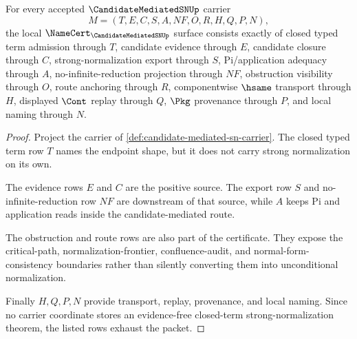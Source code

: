 \begin{theorem}
\label{thm:candidate-mediated-sn-namecert-obligations}
For every accepted $\CandidateMediatedSNUp$ carrier
$$
M=(T,E,C,S,A,NF,O,R,H,Q,P,N),
$$
the local $\NameCert_{\CandidateMediatedSNUp}$ surface consists exactly of closed typed term admission through $T$, candidate evidence through $E$, candidate closure through $C$, strong-normalization export through $S$, Pi/application adequacy through $A$, no-infinite-reduction projection through $NF$, obstruction visibility through $O$, route anchoring through $R$, componentwise $\hsame$ transport through $H$, displayed $\Cont$ replay through $Q$, $\Pkg$ provenance through $P$, and local naming through $N$.
\end{theorem}
\begin{proof}
Project the carrier of \autoref{def:candidate-mediated-sn-carrier}. The closed typed term row $T$ names the endpoint shape, but it does not carry strong normalization on its own.

The evidence rows $E$ and $C$ are the positive source. The export row $S$ and no-infinite-reduction row $NF$ are downstream of that source, while $A$ keeps Pi and application reads inside the candidate-mediated route.

The obstruction and route rows are also part of the certificate. They expose the critical-path, normalization-frontier, confluence-audit, and normal-form-consistency boundaries rather than silently converting them into unconditional normalization.

Finally $H,Q,P,N$ provide transport, replay, provenance, and local naming. Since no carrier coordinate stores an evidence-free closed-term strong-normalization theorem, the listed rows exhaust the packet.
\end{proof}

